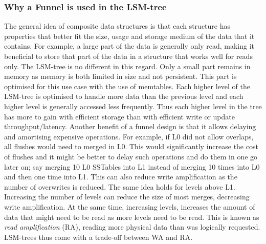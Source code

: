 \subsubsection{Why a Funnel is used in the LSM-tree}
 The general idea of composite data structures is that each structure has properties that better fit the size, usage and storage medium of the data that it contains. For example, a large part of the data is generally only read, making it beneficial to store that part of the data in a structure that works well for reads only. The LSM-tree is no different in this regard. Only a small part remains in memory as memory is both limited in size and not persistent. This part is optimised for this use case with the use of memtables. Each higher level of the LSM-tree is optimised to handle more data than the previous level and each higher level is generally accessed less frequently. Thus each higher level in the tree has more to gain with efficient storage than with efficient write or update throughput/latency. Another benefit of a funnel design is that it allows delaying and amortising expensive operations. For example, if L0 did not allow overlaps, all flushes would need to merged in L0. This would significantly increase the cost of flushes and it might be better to delay such operations and do them in one go later on; say merging 10 L0 SSTables into L1 instead of merging 10 times into L0 and then one time into L1. This can also reduce write amplification as the number of overwrites is reduced. The same idea holds for levels above L1. Increasing the number of levels can reduce the size of most merges, decreasing write amplification. At the same time, increasing levels, increases the amount of data that might need to be read as more levels need to be read. This is known as \textit{read amplification} (RA), reading more physical data than was logically requested. LSM-trees thus come with a trade-off between WA and RA. 

